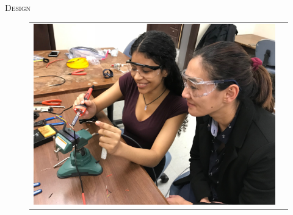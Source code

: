 \documentclass[final,t]{beamer}
\begin{document}
\begin{frame}{}
\begin{columns}[t]
\begin{column}{.5\linewidth}
                \begin{block}{\textsc{Design}}
                    \vspace*{6mm}

                    \begin{center}
                    \begin{figure}
                    \begin{tabular}{cc}
                    \includegraphics[scale = 0.15]{assets/IMG_9097.JPG}
                    \hspace*{5mm}
                    &

\end{tabular}
\end{figure}
\end{center}
\end{block}
\end{column}
\end{columns}
\end{frame}
\end{document}
